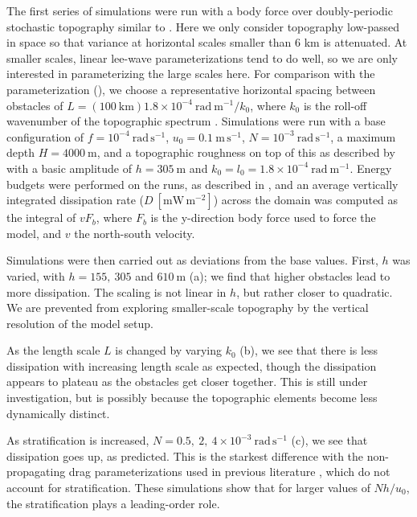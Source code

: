 \documentclass[twocol]{ametsocV5}
\begin{document}
The first series of simulations were run with a body force over doubly-periodic stochastic topography similar to \citet{klymak18}. Here we only consider topography low-passed in space so that variance at horizontal scales smaller than 6 km is attenuated.  At smaller scales, linear lee-wave parameterizations tend to do well, so we are only interested in parameterizing the large scales here.  For comparison with the parameterization (), we choose a representative horizontal spacing between obstacles of $L = \left(100 \ \mathrm{km}\right) 1.8 \times 10^{-4}\ \mathrm{rad\ m^{-1}} / k_0$, where $k_0$ is the roll-off wavenumber of the topographic spectrum \citep{klymak18}.  Simulations were run with a base configuration of $f=10^{-4}\ \mathrm{rad\, s^{-1}}$, $u_0=0.1\ \mathrm{m\,s^{-1}}$, $N=10^{-3}\ \mathrm{rad\, s^{-1}}$, a maximum depth $H=4000\ \mathrm{m}$, and a topographic roughness on top of this as described by  with a basic amplitude of $h = 305\ \mathrm{m}$ and $k_0 = l_0 = 1.8\times10^{-4}\ \mathrm{rad\ m^{-1}}$. Energy budgets were performed on the runs, as described in \citep{klymak18}, and an average vertically integrated dissipation rate ($D \ \mathrm{[mW\,m^{-2}]}$) across the domain was computed as the integral of $v F_b$, where $F_b$ is the y-direction body force used to force the model, and $v$ the north-south velocity.

Simulations were then carried out as deviations from the base values.  First, $h$ was varied, with $h = 155,\ 305$ and $610\ \mathrm{m}$ (a); we find that higher obstacles lead to more dissipation.  The scaling is not linear in $h$, but rather closer to quadratic. We are prevented from exploring smaller-scale topography by the vertical resolution of the model setup.

As the length scale $L$ is changed by varying  $k_0$ (b), we see that there is less dissipation with increasing length scale as expected, though the dissipation appears to plateau as the obstacles get closer together.  This is still under investigation, but is possibly because the topographic elements become less dynamically distinct.

As stratification is increased, $N = 0.5,\ 2,\ 4\times 10^{-3}\ \mathrm{rad\, s^{-1}}$ (c), we see that dissipation goes up, as predicted.  This is the starkest difference with the non-propagating drag parameterizations used in previous literature \citep[i.e.][]{trossmanetal13}, which do not account for stratification.  These simulations show that for  larger values of $Nh/u_0$, the stratification plays a leading-order role.
\end{document}
